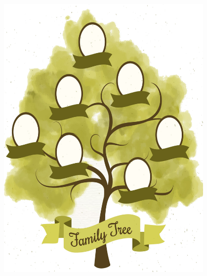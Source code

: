 \begin{frame}
\begin{columns}
        \begin{column}{0.3\textwidth}
            \begin{figure}[!ht]
                \includegraphics[width=0.95\textwidth]{figures/apgraph/tree.jpg}
            \end{figure}
        \end{column}
    \end{columns}

\end{frame}

